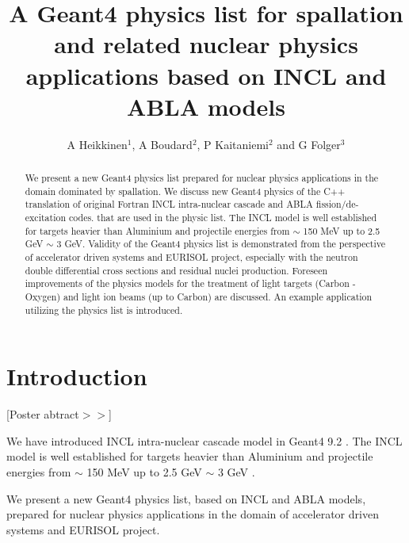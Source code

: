 \documentclass[a4paper]{jpconf}
\begin{document}
\title{A Geant4 physics list for spallation and related nuclear physics applications 
based on INCL and ABLA models}

\author{A Heikkinen$^1$, A Boudard$^2$, P Kaitaniemi$^2$ and G Folger$^3$}


\address{$^1$ Helsinki Institute of Physics, P.O. Box 64, FIN-00014 University of Helsinki, Finland}
\address{$^2$ CEN-Saclay, CEA-IRFU/SPhN, 91 191 Gif sur Yvette, France}
\address{$^3$ European Organization for Nuclear Research (CERN), Switzerland}


\begin{abstract}
We present a new Geant4 physics list prepared for nuclear physics applications
in the domain dominated by spallation.
We discuss new Geant4 physics of the C++ translation of original Fortran 
INCL intra-nuclear cascade and ABLA fission/de-excitation codes.
that are used in the physic list.
The INCL model is well established for targets heavier than Aluminium
and projectile energies from $\sim$ 150 MeV up to 2.5 GeV $\sim$ 3 GeV.
Validity of the Geant4 physics list is demonstrated from the perspective of accelerator driven systems
and EURISOL project, especially with the neutron double differential cross sections and residual
nuclei production.
Foreseen improvements of the physics models for the treatment of light targets (Carbon - Oxygen)
and light ion beams (up to Carbon) are discussed.
An example application utilizing the physics list is introduced.
\end{abstract}

\section{Introduction} \label{sec:intro}
[Poster abtract$>>$]

We have introduced INCL \cite{incl} intra-nuclear cascade model in Geant4 9.2 \cite{g4}.
The INCL model is well established for targets heavier than Aluminium
and projectile energies from $\sim$ 150 MeV up to 2.5 GeV $\sim$ 3 GeV \cite{pk08bProceedings}. 


We present a new Geant4 physics list, based on INCL and ABLA models, 
prepared for nuclear physics applications in the domain
of accelerator driven systems and EURISOL project.
\end{document}
